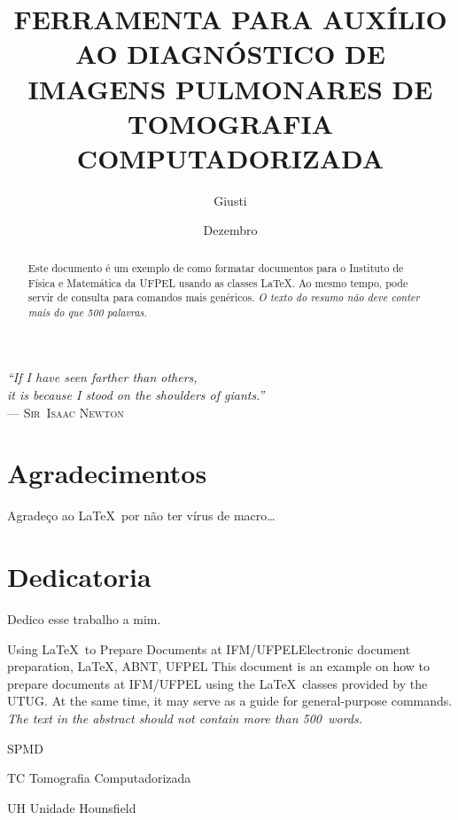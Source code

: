 \documentclass[tc]{texufpel}
\author{Giusti}{Filipe Vernetti}
\title{FERRAMENTA PARA AUXÍLIO AO DIAGNÓSTICO DE IMAGENS PULMONARES DE TOMOGRAFIA COMPUTADORIZADA}
\date{Dezembro}{2008}
\begin{document}
\maketitle

\makeexaminers

\clearpage
\begin{flushright}
\mbox{}\vfill
{\sffamily\itshape
``If I have seen farther than others,\\
it is because I stood on the shoulders of giants.''\\}
--- \textsc{Sir~Isaac Newton}
\end{flushright}

\chapter*{Agradecimentos}
Agradeço ao \LaTeX\ por não ter vírus de macro\ldots

\chapter*{Dedicatoria}
Dedico esse trabalho a mim.

\begin{abstract}
Este documento é um exemplo de como formatar documentos para o
Instituto de Física e Matemática da UFPEL usando as classes \LaTeX\@. Ao mesmo tempo, pode servir de consulta
para comandos mais genéricos. \emph{O texto do resumo não deve
conter mais do que 500 palavras.}
\end{abstract}

\begin{englishabstract}{Using \LaTeX\ to Prepare Documents at IFM/UFPEL}{Electronic document preparation, \LaTeX, ABNT, UFPEL}
This document is an example on how to prepare documents at IFM/UFPEL
using the \LaTeX\ classes provided by the UTUG\@. At the same time, it
may serve as a guide for general-purpose commands. \emph{The text in
the abstract should not contain more than 500~words.}
\end{englishabstract}

\listoffigures
\listoftables

\begin{listofabbrv}{SPMD}
        \item[TC] Tomografia Computadorizada
	\item[UH] Unidade Hounsfield
\end{listofabbrv}
\end{document}
